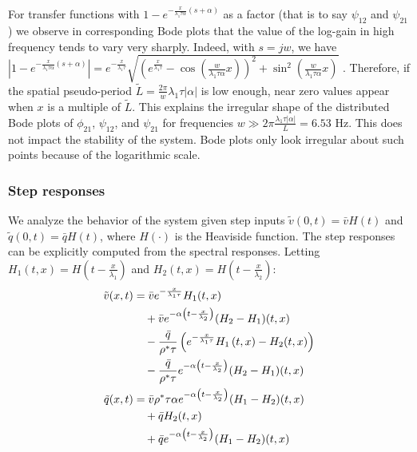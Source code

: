 \documentclass[letterpaper, 10 pt, conference]{ieeeconf}  %
\begin{document}
For transfer functions with {\footnotesize$1 - e^{-\frac{x}{\lambda_{1} \tau \alpha} \left(s + \alpha \right)}$} as a factor (that is to say $\psi_{12}$ and $\psi_{21}$) we observe in corresponding Bode plots that the value of the log-gain in high frequency tends to vary very sharply. Indeed, with $s = jw$, we have
{\footnotesize
$
\left| 
	1 - e^{-\frac{x}{\lambda_{1} \tau \alpha} \left(s + \alpha\right)}
\right| = 
e^{-\frac{x}{\lambda_{1} \tau}}
\sqrt{
	\left(
		e^{\frac{x}{\lambda_{1}\tau}} 
		-
		\cos\left(\frac{w}{\lambda_{1} \tau \alpha} x\right)
	\right)^{2}
	+
	\sin^{2}\left( \frac{w}{\lambda_{1} \tau \alpha} x \right)
}
$
}. Therefore, if the spatial pseudo-period {\footnotesize$\tilde{L}=\frac{2\pi}{w} \lambda_{1} \tau \left|\alpha\right|$} is low enough, near zero values appear when $x$ is a multiple of $\tilde{L}$. This explains the irregular shape of the distributed Bode plots of $\phi_{21}$, $\psi_{12}$, and $\psi_{21}$ for frequencies {\footnotesize$w \gg 2 \pi \frac{\lambda_{1} \tau \left|\alpha\right|}{L} = 6.53$} Hz. This does not impact the stability of the system. Bode plots only look irregular about such points because of the logarithmic scale.

\subsubsection{Step responses}
We analyze the behavior of the system given step inputs $\tilde{v}(0,t)=\bar{v}H(t)$ and $\tilde{q}(0,t)=\bar{q}H(t)$, where $H(\cdot)$ is the Heaviside function. The step responses can be explicitly computed from the spectral responses. Letting $H_1(t,x) = H\left(t-\frac{x}{\lambda_{1}}\right)$ and
$H_2(t,x) = H\left(t - \frac{x}{\lambda_{2}} \right)$:
\begin{align}
\tilde{v}(x,t) &= 
\bar{v}
e^{-\frac{x}{\lambda_{1}\tau}}H_1(t,x)
\notag\\
&\quad
+\bar{v}
e^{-\alpha \left(t - \frac{x}{\lambda_{2}} \right)}
	(H_2 - H_1)(t,x)
\notag \\
&\quad
- \dfrac{\bar{q}}{\rho^* \tau}
\left(
	e^{-\frac{x}{\lambda_{1}\tau}}H_1\left(t,x\right) 
	- H_2(t,x)
\right) 
\notag\\
&\quad
- \dfrac{\bar{q}}{\rho^* \tau} e^{-\alpha \left(t - \frac{x}{\lambda_{2}} \right)}
	(H_2 - H_1)(t,x)\\
\tilde{q}(x,t) &= \bar{v} \rho^*\tau \alpha e^{-\alpha \left(t - \frac{x}{\lambda_{2}} \right)}
	(H_1 - H_2)(t,x)
\notag \\
&\quad+ 
\bar{q}
H_2(t,x)
\notag\\
&\quad
+
\bar{q}
e^{-\alpha \left(t - \frac{x}{\lambda_{2}} \right)}
	(H_1 - H_2)(t,x)	
\end{align}
\end{document}
